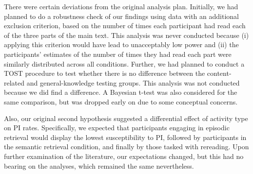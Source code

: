\documentclass[12pt]{article}
\begin{document}
There were certain deviations from the original analysis plan.
Initially, we had planned to do a robustness check of our findings using
data with an additional exclusion criterion, based on the number of times
each participant had read each of the three parts of the main text. This analysis
was never conducted because (i) applying this criterion would have lead to
unacceptably low power and (ii) the participants' estimates of the number
of times they had read each part were similarly distributed across all conditions.
Further, we had planned to conduct a TOST procedure to test whether there is
no difference between the content-related and general-knowledge testing
groups. This analysis was not conducted because we did find a difference.
A Bayesian t-test was also considered for the same comparison, but was dropped
early on due to some conceptual concerns.

Also, our original second
hypothesis suggested a differential effect of 
activity type on PI rates. 
Specifically, we expected that participants engaging 
in episodic retrieval 
would display the lowest susceptibility to PI, 
followed by participants in 
the semantic retrieval condition, and finally by 
those tasked with 
rereading. Upon further examination of the literature, 
our expectations 
changed, but this had no bearing on the analyses, 
which remained the same 
nevertheless.

\clearpage

{}



\clearpage
\end{document}
